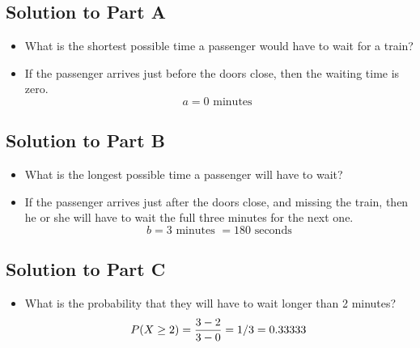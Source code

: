 \documentclass[a4paper,12pt]{article}
\begin{document}
{
\subsection*{Solution to Part A}

\begin{itemize}
\item What is the shortest possible time a passenger would have to wait for a train?
\item If the passenger arrives just before the doors close, then the waiting time is zero.
\[ a = 0 \mbox{ minutes } \]
\end{itemize}
\subsection*{Solution to Part B}
\begin{itemize}
\item What is the longest possible time a passenger will have to wait?
\item If the passenger arrives just after the doors close, and missing the train, then he or she will have to wait the full three minutes for the next one.
\[ b = 3 \mbox{ minutes }  = 180 \mbox{ seconds}  \]
\end{itemize}
\subsection*{Solution to Part C}



\begin{itemize}
\item What is the probability that they will have to wait longer than 2 minutes?
\[ P(X \geq 2)  = {3-2 \over 3-0} = {1/3} = 0.33333   \]
\end{itemize}



}
\end{document}
